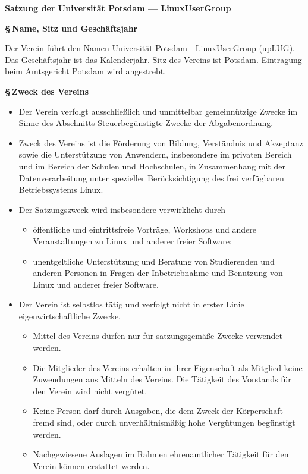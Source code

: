 \documentclass[11pt]{article}
\def\normalfont{\sffamily}
\def\items#1{{%
  \itcounter0%
  \begin{itemize}
  #1
  \end{itemize}
}}
\let\it\item%
\def\item{
  \advance\itcounter1%
  \it[(\the\itcounter)]
}
\def\paragraf#1{
  \advance\itcounter1%
  \par\medskip
  {\large\bfseries \S\,\the\itcounter\quad#1}
  \par\smallskip
}
\begin{document}
\normalfont
\fontsize{11pt}{8pt}\selectfont

\centerline{\Large\bfseries  Satzung der Universit{\"a}t Potsdam --- LinuxUserGroup}
\par
\bigskip

\paragraf{Name, Sitz und Gesch{\"a}ftsjahr}
\medskip

Der Verein f{\"u}hrt den Namen \glqq Universit{\"a}t Potsdam - LinuxUserGroup\grqq{} (upLUG).
Das Gesch{\"a}ftsjahr ist das Kalenderjahr.
Sitz des Vereins ist Potsdam.
Eintragung beim Amtsgericht Potsdam wird angestrebt.
%
%
\bigskip

\paragraf{Zweck des Vereins}

\items{
  \item
    Der Verein verfolgt ausschlie{\ss}lich und unmittelbar gemeinn{\"u}tzige Zwecke
    im Sinne des Abschnitts \glqq Steuerbeg{\"u}nstigte Zwecke\grqq{} der Abgabenordnung.
  \item
     Zweck des Vereins ist die F{\"o}rderung von Bildung, Verst{\"a}ndnis und
     Akzeptanz sowie die Unter\-st{\"u}tzung von Anwendern, insbesondere im privaten Bereich
     und im Bereich der Schulen und Hochschulen, in Zusammenhang mit der Datenverarbeitung
     unter spezieller Ber{\"u}cksichtigung des frei ver\-f{\"u}g\-baren Betriebssystems Linux.
   \item
     Der Satzungszweck wird insbesondere verwirklicht durch
      \items{
        \item
          {\"o}ffentliche und eintrittsfreie
          Vortr{\"a}ge, Workshops und andere Veranstaltungen zu Linux und anderer
          freier Software;
        \item
          unentgeltliche Unterst{\"u}tzung und Beratung von Studierenden und anderen Personen
          in Fragen der Inbetriebnahme und Benutzung von Linux und anderer freier Software.
      }
   \item
     Der Verein ist selbstlos t{\"a}tig und verfolgt nicht in erster Linie eigenwirtschaftliche Zwecke.
     \items{
       \item
         Mittel des Vereins d{\"u}rfen nur f{\"u}r satzungsgem{\"a}{\ss}e Zwecke verwendet werden.
       \item
         Die Mitglieder des Vereins erhalten in ihrer Eigenschaft als Mitglied
         keine Zuwendungen aus Mitteln des Vereins. Die T{\"a}tigkeit des Vorstands f{\"u}r den
         Verein wird nicht verg{\"u}tet.
       \item
         Keine Person darf durch Ausgaben, die dem Zweck der K{\"o}rperschaft fremd sind, oder durch
         unverh{\"a}ltnism{\"a}{\ss}ig hohe Verg{\"u}tungen beg{\"u}nstigt werden.
       \item
         Nachgewiesene Auslagen im Rahmen ehrenamtlicher T{\"a}tigkeit f{\"u}r den Verein
         k{\"o}nnen erstattet werden.
     }
}
\end{document}
